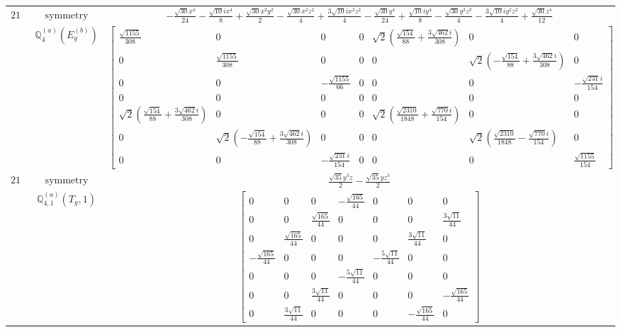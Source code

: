 \documentclass[fleqn,8pt,landscape]{jsarticle}
\begin{document}
\begin{longtable}{ccc}
$ 216 $ & $ \text{symmetry} $ & $ - \frac{\sqrt{30} x^{4}}{24} - \frac{\sqrt{10} i x^{4}}{8} + \frac{\sqrt{30} x^{2} y^{2}}{2} - \frac{\sqrt{30} x^{2} z^{2}}{4} + \frac{3 \sqrt{10} i x^{2} z^{2}}{4} - \frac{\sqrt{30} y^{4}}{24} + \frac{\sqrt{10} i y^{4}}{8} - \frac{\sqrt{30} y^{2} z^{2}}{4} - \frac{3 \sqrt{10} i y^{2} z^{2}}{4} + \frac{\sqrt{30} z^{4}}{12} $ \\
$  $ & $ \mathbb{Q}_{4}^{(a)}(E_{g}^{(b)}) $ & $ \begin{bmatrix} \frac{\sqrt{1155}}{308} & 0 & 0 & 0 & \sqrt{2} \left(\frac{\sqrt{154}}{88} + \frac{3 \sqrt{462} i}{308}\right) & 0 & 0 \\ 0 & \frac{\sqrt{1155}}{308} & 0 & 0 & 0 & \sqrt{2} \left(- \frac{\sqrt{154}}{88} + \frac{3 \sqrt{462} i}{308}\right) & 0 \\ 0 & 0 & - \frac{\sqrt{1155}}{66} & 0 & 0 & 0 & - \frac{\sqrt{231} i}{154} \\ 0 & 0 & 0 & 0 & 0 & 0 & 0 \\ \sqrt{2} \left(\frac{\sqrt{154}}{88} + \frac{3 \sqrt{462} i}{308}\right) & 0 & 0 & 0 & \sqrt{2} \left(\frac{\sqrt{2310}}{1848} + \frac{\sqrt{770} i}{154}\right) & 0 & 0 \\ 0 & \sqrt{2} \left(- \frac{\sqrt{154}}{88} + \frac{3 \sqrt{462} i}{308}\right) & 0 & 0 & 0 & \sqrt{2} \left(\frac{\sqrt{2310}}{1848} - \frac{\sqrt{770} i}{154}\right) & 0 \\ 0 & 0 & - \frac{\sqrt{231} i}{154} & 0 & 0 & 0 & \frac{\sqrt{1155}}{154} \end{bmatrix} $ \\ \hline
$ 217 $ & $ \text{symmetry} $ & $ \frac{\sqrt{35} y^{3} z}{2} - \frac{\sqrt{35} y z^{3}}{2} $ \\
$  $ & $ \mathbb{Q}_{4,1}^{(a)}(T_{g},1) $ & $ \begin{bmatrix} 0 & 0 & 0 & - \frac{\sqrt{165}}{44} & 0 & 0 & 0 \\ 0 & 0 & \frac{\sqrt{165}}{44} & 0 & 0 & 0 & \frac{3 \sqrt{11}}{44} \\ 0 & \frac{\sqrt{165}}{44} & 0 & 0 & 0 & \frac{3 \sqrt{11}}{44} & 0 \\ - \frac{\sqrt{165}}{44} & 0 & 0 & 0 & - \frac{5 \sqrt{11}}{44} & 0 & 0 \\ 0 & 0 & 0 & - \frac{5 \sqrt{11}}{44} & 0 & 0 & 0 \\ 0 & 0 & \frac{3 \sqrt{11}}{44} & 0 & 0 & 0 & - \frac{\sqrt{165}}{44} \\ 0 & \frac{3 \sqrt{11}}{44} & 0 & 0 & 0 & - \frac{\sqrt{165}}{44} & 0 \end{bmatrix} $ \\ \hline

\end{longtable}
\end{document}
